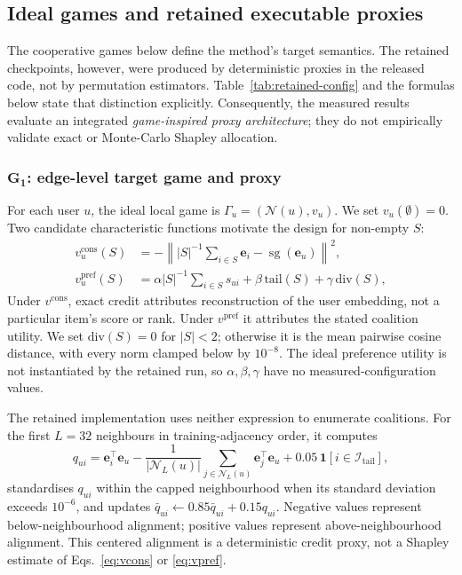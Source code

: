 \documentclass[a4paper,fleqn,longmktitle]{cas-dc}
\begin{document}
\subsection{Ideal games and retained executable proxies}
\label{sec:retained}

The cooperative games below define the method's target semantics. The retained
checkpoints, however, were produced by deterministic proxies in the released
code, not by permutation estimators. Table~\ref{tab:retained-config} and the
formulas below state that distinction explicitly. Consequently, the measured
results evaluate an integrated \emph{game-inspired proxy architecture}; they
do not empirically validate exact or Monte-Carlo Shapley allocation.

\subsubsection{$\mathbf{G_1}$: edge-level target game and proxy}

For each user $u$, the ideal local game is
$\Gamma_u=(\mathcal{N}(u),v_u)$. We set $v_u(\emptyset)=0$. Two candidate
characteristic functions motivate the design for non-empty $S$:
\begin{align}
v_u^{\mathrm{cons}}(S)
 &= -\left\lVert |S|^{-1}\!\sum_{i\in S}\mathbf e_i
                 -\operatorname{sg}(\mathbf e_u)\right\rVert^2,
\label{eq:vcons}\\
v_u^{\mathrm{pref}}(S)
 &= \alpha |S|^{-1}\!\sum_{i\in S}s_{ui}
  +\beta\,\mathrm{tail}(S)+\gamma\,\mathrm{div}(S),
\label{eq:vpref}
\end{align}
Under $v^{\mathrm{cons}}$, exact credit attributes reconstruction of the user
embedding, not a particular item's score or rank. Under $v^{\mathrm{pref}}$ it
attributes the stated coalition utility. We set $\mathrm{div}(S)=0$ for
$|S|<2$; otherwise it is the mean pairwise cosine distance, with every norm clamped below by $10^{-8}$. The ideal
preference utility is not instantiated by the retained run, so
$\alpha,\beta,\gamma$ have no measured-configuration values.

The retained implementation uses neither expression to enumerate coalitions.
For the first $L=32$ neighbours in training-adjacency order, it computes
\begin{equation}
q_{ui}=\mathbf e_i^\top\mathbf e_u
-\frac{1}{|\mathcal N_L(u)|}\sum_{j\in\mathcal N_L(u)}
 \mathbf e_j^\top\mathbf e_u
+0.05\,\mathbf 1[i\in\mathcal I_{\mathrm{tail}}],
\label{eq:g1proxy}
\end{equation}
standardises $q_{ui}$ within the capped neighbourhood when its standard
deviation exceeds $10^{-6}$, and updates
$\bar q_{ui}\leftarrow0.85\bar q_{ui}+0.15q_{ui}$. Negative values represent
below-neighbourhood alignment; positive values represent above-neighbourhood
alignment. This centered alignment is a deterministic credit proxy, not a
Shapley estimate of Eqs.~\eqref{eq:vcons} or \eqref{eq:vpref}.
\end{document}
